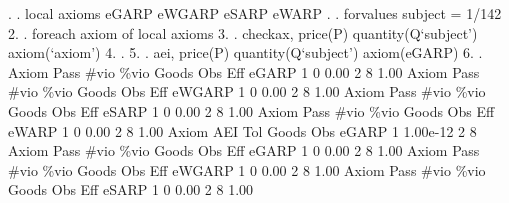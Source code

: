 . 
. local axioms eGARP eWGARP eSARP eWARP
{\smallskip}
. 
. forvalues subject = 1/142 {\lbr}
  2.         
.         foreach axiom of local axioms {\lbr}
  3.         
.                 checkax, price(P) quantity(Q`subject') axiom(`axiom')
  4.         
.         {\rbr}
  5. 
.         aei, price(P) quantity(Q`subject') axiom(eGARP)
  6. 
. {\rbr}
{\smallskip}
{\smallskip}
{\smallskip}
       Axiom {\VBAR} Pass        \#vio        \%vio       Goods         Obs         Eff  
       eGARP {\VBAR}    1           0        0.00           2           8        1.00  
{\smallskip}
{\smallskip}
{\smallskip}
       Axiom {\VBAR} Pass        \#vio        \%vio       Goods         Obs         Eff  
      eWGARP {\VBAR}    1           0        0.00           2           8        1.00  
{\smallskip}
{\smallskip}
{\smallskip}
       Axiom {\VBAR} Pass        \#vio        \%vio       Goods         Obs         Eff  
       eSARP {\VBAR}    1           0        0.00           2           8        1.00  
{\smallskip}
{\smallskip}
{\smallskip}
       Axiom {\VBAR} Pass        \#vio        \%vio       Goods         Obs         Eff  
       eWARP {\VBAR}    1           0        0.00           2           8        1.00  
{\smallskip}
       Axiom {\VBAR}       AEI        Tol      Goods        Obs 
       eGARP {\VBAR}         1   1.00e-12          2          8 
{\smallskip}
{\smallskip}
{\smallskip}
       Axiom {\VBAR} Pass        \#vio        \%vio       Goods         Obs         Eff  
       eGARP {\VBAR}    1           0        0.00           2           8        1.00  
{\smallskip}
{\smallskip}
{\smallskip}
       Axiom {\VBAR} Pass        \#vio        \%vio       Goods         Obs         Eff  
      eWGARP {\VBAR}    1           0        0.00           2           8        1.00  
{\smallskip}
{\smallskip}
{\smallskip}
       Axiom {\VBAR} Pass        \#vio        \%vio       Goods         Obs         Eff  
       eSARP {\VBAR}    1           0        0.00           2           8        1.00  
{\smallskip}
